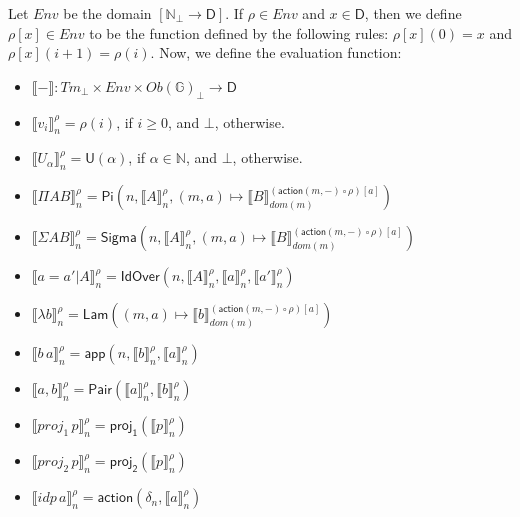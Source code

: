 \documentclass{amsart}
\theoremstyle{definition}
\theoremstyle{remark}
\newcommand{\D}{\mathsf{D}}
\newcommand{\bbG}{\mathbb{G}}
\newcommand{\nats}{\mathbb{N}}
\numberwithin{table}{section}
\begin{document}
Let $Env$ be the domain $[\nats_\bot \to \D]$.
If $\rho \in Env$ and $x \in \D$, then we define $\rho[x] \in Env$ to be the function defined by the following rules: $\rho[x](0) = x$ and $\rho[x](i+1) = \rho(i)$.
Now, we define the evaluation function:
\begin{itemize}
\item[] $\llbracket - \rrbracket : Tm_\bot \times Env \times Ob(\bbG)_\bot \to \D$
\item[] $\llbracket v_i \rrbracket^\rho_n = \rho(i)$, if $i \geq 0$, and $\bot$, otherwise.
\item[] $\llbracket U_\alpha \rrbracket^\rho_n = \mathsf{U}(\alpha)$, if $\alpha \in \nats$, and $\bot$, otherwise.
\item[] $\llbracket \Pi A B \rrbracket^\rho_n = \mathsf{Pi}(n, \llbracket A \rrbracket^\rho_n, (m, a) \mapsto \llbracket B \rrbracket^{(\mathsf{action}(m,-) \circ \rho)[a]}_{dom(m)})$
\item[] $\llbracket \Sigma A B \rrbracket^\rho_n = \mathsf{Sigma}(n, \llbracket A \rrbracket^\rho_n, (m, a) \mapsto \llbracket B \rrbracket^{(\mathsf{action}(m,-) \circ \rho)[a]}_{dom(m)})$
\item[] $\llbracket a = a' | A \rrbracket^\rho_n = \mathsf{IdOver}(n, \llbracket A \rrbracket^\rho_n, \llbracket a \rrbracket^\rho_n, \llbracket a' \rrbracket^\rho_n)$
\item[] $\llbracket \lambda b \rrbracket^\rho_n = \mathsf{Lam}((m, a) \mapsto \llbracket b \rrbracket^{(\mathsf{action}(m,-) \circ \rho)[a]}_{dom(m)})$
\item[] $\llbracket b\,a \rrbracket^\rho_n = \mathsf{app}(n, \llbracket b \rrbracket^\rho_n, \llbracket a \rrbracket^\rho_n)$
\item[] $\llbracket a, b \rrbracket^\rho_n = \mathsf{Pair}(\llbracket a \rrbracket^\rho_n, \llbracket b \rrbracket^\rho_n)$
\item[] $\llbracket proj_1\,p \rrbracket^\rho_n = \mathsf{proj_1}(\llbracket p \rrbracket^\rho_n)$
\item[] $\llbracket proj_2\,p \rrbracket^\rho_n = \mathsf{proj_2}(\llbracket p \rrbracket^\rho_n)$
\item[] $\llbracket idp\,a \rrbracket^\rho_n = \mathsf{action}(\delta_n,\llbracket a \rrbracket^\rho_n)$
\end{itemize}
\end{document}
